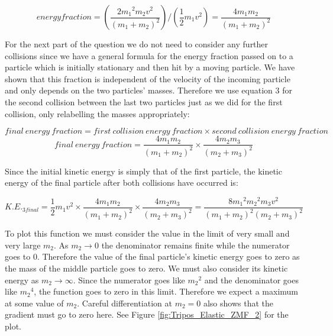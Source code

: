 \begin{problem}
{\begin{equation}energy fraction=\left(\frac{2{m_1}^2m_2v^2}{\left(m_1 + m_2\right)^2}\right)/\left(\frac{1}{2}m_1v^2\right)=\frac{4m_{1}m_{2}}{(m_{1}+m_{2})^{2}}\end{equation}

For the next part of the question we do not need to consider any further collisions since we have a general formula for the energy fraction passed on to a particle which is initially stationary and then hit by a moving particle. We have shown that this fraction is independent of the velocity of the incoming particle and only depends on the two particles' masses. Therefore we use equation 3 for the second collision between the last two particles just as we did for the first collision, only relabelling the masses appropriately:

\begin{equation*}final~energy~fraction=first~collision~energy~fraction \times second~collision~energy~fraction\end{equation*}
\begin{equation*}final~energy~fraction=\frac{4m_{1}m_{2}}{(m_{1}+m_{2})^{2}}\times \frac{4m_{2}m_{3}}{(m_{2}+m_{3})^{2}}\end{equation*}

Since the initial kinetic energy is simply that of the first particle, the kinetic energy of the final particle after both collisions have occurred is:

\begin{equation*}K.E._{3final}=\frac{1}{2}m_1v^2 \times \frac{4m_{1}m_{2}}{(m_{1}+m_{2})^{2}}\times \frac{4m_{2}m_{3}}{(m_{2}+m_{3})^{2}}=\frac{8{m_{1}}^2{m_{2}}^2m_3v^2}{(m_{1}+m_{2})^{2}(m_{2}+m_{3})^{2}}\end{equation*}

To plot this function we must consider the value in the limit of very small and very large $m_2$. As $m_2 \to 0$ the denominator remains finite while the numerator goes to 0. Therefore the value of the final particle's kinetic energy goes to zero as the mass of the middle particle goes to zero. We must also consider its kinetic energy as $m_2 \to \infty$. Since the numerator goes like ${m_2}^2$ and the denominator goes like ${m_2}^4$, the function goes to zero in this limit. Therefore we expect a maximum at some value of $m_2$. Careful differentiation at $m_2=0$ also shows that the gradient must go to zero here. See Figure \ref{fig:Tripos_Elastic_ZMF_2} for the plot. 

}
\end{problem}
